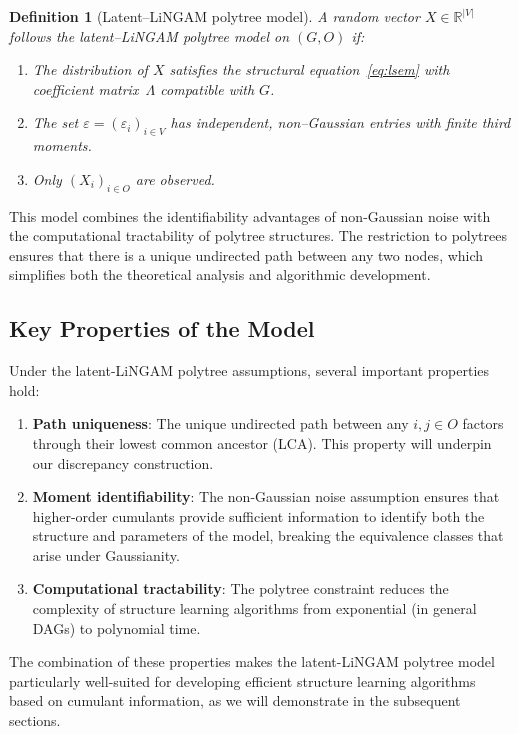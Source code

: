 \documentclass[11pt,a4paper]{article}
\numberwithin{equation}{section}
\newtheorem{definition}[theorem]{Definition}
\begin{document}
\begin{definition}[Latent--LiNGAM polytree model]\label{def:latent_lingam_model}
A random vector $X\in\mathbb R^{|V|}$ follows the latent--LiNGAM polytree model on $(G,O)$ if:
\begin{enumerate}[label=(\roman*)]
  \item The distribution of $X$ satisfies the structural equation~\eqref{eq:lsem} with coefficient matrix~$\Lambda$ compatible with $G$.
  \item The set $\varepsilon=(\varepsilon_i)_{i\in V}$ has independent, non--Gaussian entries with finite third moments.
  \item Only $(X_i)_{i\in O}$ are observed.
\end{enumerate}
\end{definition}

This model combines the identifiability advantages of non-Gaussian noise with the computational tractability of polytree structures. The restriction to polytrees ensures that there is a unique undirected path between any two nodes, which simplifies both the theoretical analysis and algorithmic development.

\subsection{Key Properties of the Model}

Under the latent-LiNGAM polytree assumptions, several important properties hold:

\begin{enumerate}[label=(\arabic*)]
\item \textbf{Path uniqueness}: The unique undirected path between any $i,j\in O$ factors through their lowest common ancestor (LCA). This property will underpin our discrepancy construction.

\item \textbf{Moment identifiability}: The non-Gaussian noise assumption ensures that higher-order cumulants provide sufficient information to identify both the structure and parameters of the model, breaking the equivalence classes that arise under Gaussianity.

\item \textbf{Computational tractability}: The polytree constraint reduces the complexity of structure learning algorithms from exponential (in general DAGs) to polynomial time.
\end{enumerate}

The combination of these properties makes the latent-LiNGAM polytree model particularly well-suited for developing efficient structure learning algorithms based on cumulant information, as we will demonstrate in the subsequent sections.
\end{document}
